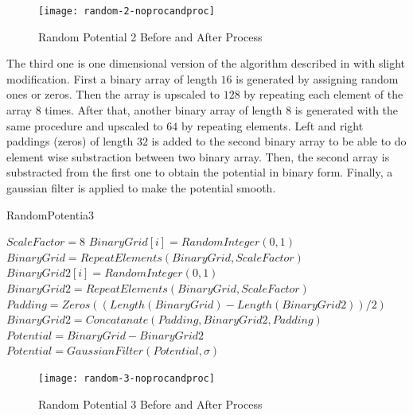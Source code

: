 \documentclass[a4paper,times,hidelinks,12pt]{article}
\begin{document}
\graphicspath{{"../figs/potentials/"}}
\begin{figure}[H]
    \centering
        \texttt{[image: random-2-noprocandproc]}
\caption{Random Potential 2 Before and After Process}
\label{fig:random2_before_after}
\end{figure}

The third one is one dimensional version of the algorithm described in \cite{mills2017deep} with slight modification. First a binary array of length $16$ is generated by assigning random ones or zeros. Then the array is upscaled to $128$ by repeating each element of the array $8$ times. After that, another binary array of length $8$ is generated with the same procedure and upscaled to $64$ by repeating elements. Left and right paddings (zeros) of length $32$ is added to the second binary array to be able to do element wise substraction between two binary array. Then, the second array is substracted from the first one to obtain the potential in binary form. Finally, a gaussian filter is applied to make the potential smooth. 

\begin{algorithm}[H]
    \caption{RandomPotentia3}\label{euclid}
    \begin{algorithmic}[1]
        \State $ \textit{ScaleFactor} = 8$
        \State $BinaryGrid[i] = RandomInteger(0, 1)$
        \EndFor
        \State $BinaryGrid = RepeatElements(BinaryGrid, ScaleFactor)$
        \State $BinaryGrid2[i] = RandomInteger(0, 1)$
        \EndFor
        \State $BinaryGrid2 = RepeatElements(BinaryGrid, ScaleFactor)$
        \State $Padding = Zeros((Length(BinaryGrid) - Length(BinaryGrid2))/2)$
        \State $BinaryGrid2 = Concatanate(Padding, BinaryGrid2, Padding) $
        \State $Potential = BinaryGrid - BinaryGrid2$
        \State $Potential = GaussianFilter(Potential, \sigma)$ 
    \EndProcedure
    \end{algorithmic}
\label{alg:random_potential_1}
\end{algorithm}

\graphicspath{{"../figs/potentials/"}}
\begin{figure}[H]
    \centering
        \texttt{[image: random-3-noprocandproc]}
\caption{Random Potential 3 Before and After Process}
\label{fig:random3_before_after}
\end{figure}
\end{document}
